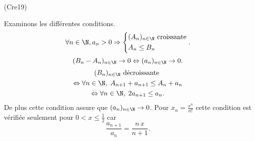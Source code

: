 \begin{tiny}(Cre19)\end{tiny} Examinons les différentes conditions.
\[
  \forall n \in \N, a_n >0 \Rightarrow
  \left\lbrace
  \begin{aligned}
    &(A_n)_{n \in \N} \text{ croissante} \\
    &A_n \leq B_n
  \end{aligned}
  \right. .
\]
\[
  (B_n - A_n)_{n \in \N}\rightarrow 0 \Leftrightarrow (a_n)_{n \in \N}\rightarrow 0.
\]
\begin{multline*}
  (B_n)_{n \in \N} \text{ décroissante }\\
  \Leftrightarrow 
  \forall n \in \N, \; A_{n+1} + a_{n+1} \leq A_n + a_n \\
  \Leftrightarrow 
  \forall n \in \N, \; 2a_{n+1} \leq a_n.  
\end{multline*}
De plus cette condition assure que $(a_n)_{n \in \N}\rightarrow 0$.\newline
Pour $x_n = \frac{x^n}{n!}$ cette condition est vérifiée seulement pour $0 < x \leq \frac{1}{2}$ car
\[
  \frac{a_{n+1}}{a_n} = \frac{n\, x}{n+1}.
\]

